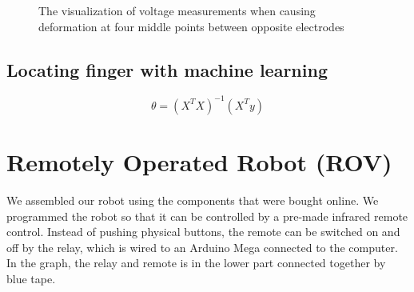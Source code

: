 \documentclass[reprint,amsmath, amsfonts, amssymb, aps, letterpaper]{revtex4-1}
\begin{document}
\begin{figure}
 	\caption{The visualization of voltage measurements when causing deformation at four middle points between opposite electrodes\label{fig::voltage_map}}
\end{figure}
 
\subsection{Locating finger with machine learning}

\begin{equation}
 	\theta = (X^TX)^{-1}(X^Ty)
\end{equation}

\section{Remotely Operated Robot (ROV)}
We assembled our robot using the components that were bought online. We programmed the robot so that it can be controlled by a pre-made infrared remote control. Instead of pushing physical buttons, the remote can be switched on and off by the relay, which is wired to an Arduino Mega connected to the computer. In the graph, the relay and remote is in the lower part connected together by blue tape.
\end{document}
